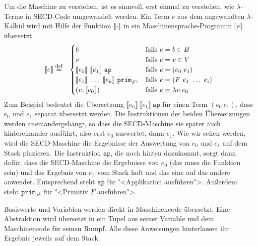 Um die Maschine zu verstehen, ist es sinnvoll, erst einmal zu
verstehen, wie $\lambda$-Terme in SECD-Code umgewandelt werden.  
Ein Term $e$ aus dem angewandten $\lambda$-Kalkül wird mit Hilfe der
Funktion $\llbracket \cdot\rrbracket$ in ein Maschinensprache-Programm
$\llbracket e\rrbracket$ übersetzt.\label{page:secd-translation}
%
\begin{eqnarray*}
  \llbracket e \rrbracket &\stackrel{\rm def}{=}&
  \begin{cases}
    b & \textrm{falls $e = b \in B$}\\
    v & \textrm{falls $e = v \in V$}\\
    \llbracket e_0\rrbracket~\llbracket e_1\rrbracket~\mathtt{ap}
    & \textrm{falls $e = (e_0~e_1)$}\\
    \llbracket e_1\rrbracket~\ldots~\llbracket e_k\rrbracket~\mathtt{prim}_{F^i}
    & \textrm{falls $e = (F~e_1~\ldots~e_i)$}\\
    (v, \llbracket e_0\rrbracket) & \textrm{falls $e = \lambda v.e_0$}
  \end{cases}
\end{eqnarray*}
%
Zum Beispiel bedeutet die Übersetzung
$\llbracket e_0\rrbracket~\llbracket e_1\rrbracket~\mathtt{ap}$ für
einen Term $(e_0~e_1)$, dass $e_0$ und $e_1$ separat übersetzt werden.
Die Instruktionen der beiden Übersetzungen werden aneinandergehängt,
so dass die SECD-Maschine sie später auch hintereinander ausführt,
also erst $e_0$ auswertet, dann $e_1$.  Wie wir sehen werden, wird die
SECD-Maschine die Ergebnisse der Auswertung von $e_0$ und $e_1$ auf
dem Stack plazieren.  Die Instruktion $\mathtt{ap}$, die noch hinten
dazukommt, sorgt dann dafür, dass die SECD-Maschine die Ergebnisse von
$e_0$ (das muss die Funktion sein) und das Ergebnis von $e_1$ vom
Stack holt und das eine auf das andere anwendet.  Entsprechend steht
$\mathtt{ap}$ für "<Applikation ausführen">.  Außerdem steht
$\mathtt{prim}_{F^k}$ für "<Primitiv $F$ ausführen">.

Basiswerte und Variablen werden direkt in Maschinencode übersetzt.
Eine Abstraktion wird übersetzt in ein Tupel aus seiner Variable und
dem Maschinencode für seinen Rumpf.  Alle diese Anweisungen
hinterlassen ihr Ergebnis jeweils auf dem Stack.

